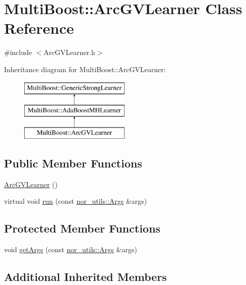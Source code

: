 \hypertarget{classMultiBoost_1_1ArcGVLearner}{\section{Multi\-Boost\-:\-:Arc\-G\-V\-Learner Class Reference}
\label{classMultiBoost_1_1ArcGVLearner}
}


{\ttfamily \#include $<$Arc\-G\-V\-Learner.\-h$>$}

Inheritance diagram for Multi\-Boost\-:\-:Arc\-G\-V\-Learner\-:\begin{figure}[H]
\begin{center}
\leavevmode
\includegraphics[height=3.000000cm]{classMultiBoost_1_1ArcGVLearner}
\end{center}
\end{figure}
\subsection*{Public Member Functions}
\begin{DoxyCompactItemize}
\item 
\hyperlink{classMultiBoost_1_1ArcGVLearner_a81c287da8219ca825b0d57acbf26b616}{Arc\-G\-V\-Learner} ()
\item 
virtual void \hyperlink{classMultiBoost_1_1ArcGVLearner_ad2e5b9873d3c752307d9639ff53ee86a}{run} (const \hyperlink{classnor__utils_1_1Args}{nor\-\_\-utils\-::\-Args} \&args)
\end{DoxyCompactItemize}
\subsection*{Protected Member Functions}
\begin{DoxyCompactItemize}
\item 
void \hyperlink{classMultiBoost_1_1ArcGVLearner_a76add0d16ac879bee32203c428a3e354}{get\-Args} (const \hyperlink{classnor__utils_1_1Args}{nor\-\_\-utils\-::\-Args} \&args)
\end{DoxyCompactItemize}
\subsection*{Additional Inherited Members}


